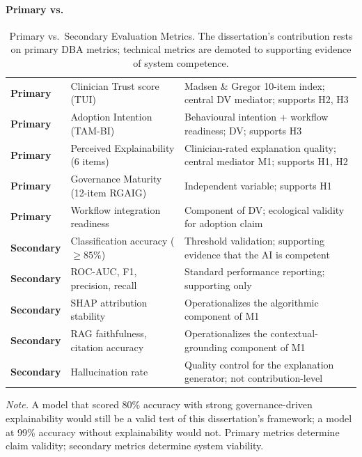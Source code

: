 \paragraph{Primary vs.}




{\tablestripes\tablefontsize
{}
\begin{xltabular}{\textwidth}{@{} >{\raggedright\arraybackslash}p{2.0cm} L L @{}}
\caption[Primary vs.\ Secondary Evaluation Metrics]{Primary vs.\ Secondary Evaluation Metrics. The dissertation's contribution rests on primary DBA metrics; technical metrics are demoted to supporting evidence of system competence.}\label{tab:eval_primary_secondary} \\
\toprule
{} &  &  \\
\midrule
\endfirsthead
\endhead
\bottomrule
\endlastfoot
\textbf{Primary}     & Clinician Trust score (TUI)           & Madsen \& Gregor 10-item index; central DV mediator; supports H2, H3 \\
\textbf{Primary}     & Adoption Intention (TAM-BI)           & Behavioural intention + workflow readiness; DV; supports H3 \\
\textbf{Primary}     & Perceived Explainability (6 items)    & Clinician-rated explanation quality; central mediator M1; supports H1, H2 \\
\textbf{Primary}     & Governance Maturity (12-item RGAIG)   & Independent variable; supports H1 \\
\textbf{Primary}     & Workflow integration readiness        & Component of DV; ecological validity for adoption claim \\
\midrule
\textbf{Secondary}   & Classification accuracy ($\geq 85\%$) & Threshold validation; supporting evidence that the AI is competent \\
\textbf{Secondary}   & ROC-AUC, F1, precision, recall         & Standard performance reporting; supporting only \\
\textbf{Secondary}   & SHAP attribution stability             & Operationalizes the algorithmic component of M1 \\
\textbf{Secondary}   & RAG faithfulness, citation accuracy    & Operationalizes the contextual-grounding component of M1 \\
\textbf{Secondary}   & Hallucination rate                     & Quality control for the explanation generator; not contribution-level \\
\end{xltabular}}
\vspace{0.4em}
\noindent\textit{Note.} A model that scored 80\% accuracy with strong governance-driven explainability would still be a valid test of this dissertation's framework; a model at 99\% accuracy without explainability would not. Primary metrics determine claim validity; secondary metrics determine system viability.

